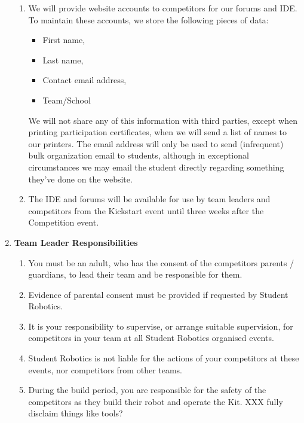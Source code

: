 \documentclass[a4paper, 11pt]{scrartcl}
\begin{document}
\begin{enumerate}
\begin{enumerate}
\item We will provide website accounts to competitors for our forums and IDE. To
maintain these accounts, we store the following pieces of data:

\begin{itemize}
\item First name,
\item Last name,
\item Contact email address,
\item Team/School
\end{itemize}
We will not share any of this information with third parties, except when
printing participation certificates, when we will send a list of names to
our printers. The email address will only be used to send (infrequent) bulk
organization email to students, although in exceptional circumstances we
may email the student directly regarding something they've done on the
website.

\item The IDE and forums will be available for use by team leaders and competitors
from the Kickstart event until three weeks after the Competition event.

\end{enumerate}

\item \textbf{Team Leader Responsibilities}
\begin{enumerate}

\item You must be an adult, who has the consent of the competitors parents /
guardians, to lead their team and be responsible for them.

\item Evidence of parental consent must be provided if requested by Student
Robotics.

\item It is your responsibility to supervise, or arrange suitable supervision,
for competitors in your team at all Student Robotics organised events.

\item Student Robotics is not liable for the actions of your competitors at
these events, nor competitors from other teams.

\item During the build period, you are responsible for the safety of the
competitors as they build their robot and operate the Kit. XXX fully disclaim
things like tools?

\end{enumerate}


\end{enumerate}
\end{document}
